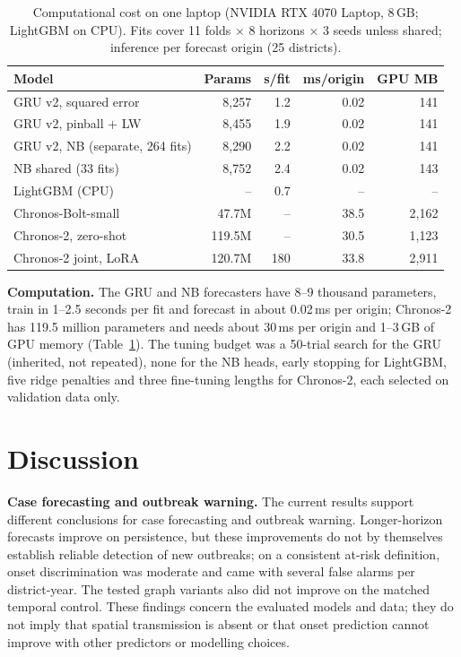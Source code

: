 \begin{table}[t]
\centering
\caption{Computational cost on one laptop (NVIDIA RTX 4070 Laptop, 8\,GB; LightGBM on CPU). Fits cover 11 folds $\times$ 8 horizons $\times$ 3 seeds unless shared; inference per forecast origin (25 districts).}
\label{tab:compute}
\small
\setlength{\tabcolsep}{2.5pt}
\begin{tabular}{lrrrr}
\toprule
\textbf{Model} & \textbf{Params} & \textbf{s/fit} & \textbf{ms/origin} & \textbf{GPU MB} \\
\midrule
GRU v2, squared error & 8{,}257 & 1.2 & 0.02 & 141 \\
GRU v2, pinball + LW & 8{,}455 & 1.9 & 0.02 & 141 \\
GRU v2, NB (separate, 264 fits) & 8{,}290 & 2.2 & 0.02 & 141 \\
NB shared (33 fits) & 8{,}752 & 2.4 & 0.02 & 143 \\
LightGBM (CPU) & -- & 0.7 & -- & -- \\
Chronos-Bolt-small & 47.7M & -- & 38.5 & 2{,}162 \\
Chronos-2, zero-shot & 119.5M & -- & 30.5 & 1{,}123 \\
Chronos-2 joint, LoRA & 120.7M & 180 & 33.8 & 2{,}911 \\
\bottomrule
\end{tabular}
\end{table}

\textbf{Computation.} The GRU and NB forecasters have 8--9 thousand parameters, train in 1--2.5 seconds per fit and forecast in about 0.02\,ms per origin; Chronos-2 has 119.5 million parameters and needs about 30\,ms per origin and 1--3\,GB of GPU memory (Table~\ref{tab:compute}). The tuning budget was a 50-trial search for the GRU (inherited, not repeated), none for the NB heads, early stopping for LightGBM, five ridge penalties and three fine-tuning lengths for Chronos-2, each selected on validation data only.

\section{Discussion}

\textbf{Case forecasting and outbreak warning.} The current results support different conclusions for case forecasting and outbreak warning. Longer-horizon forecasts improve on persistence, but these improvements do not by themselves establish reliable detection of new outbreaks; on a consistent at-risk definition, onset discrimination was moderate and came with several false alarms per district-year. The tested graph variants also did not improve on the matched temporal control. These findings concern the evaluated models and data; they do not imply that spatial transmission is absent or that onset prediction cannot improve with other predictors or modelling choices.

